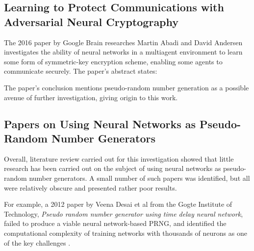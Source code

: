 \documentclass[12pt, titlepage]{report}
\theoremstyle{definition}
\begin{document}
\subsection{Learning to Protect Communications with Adversarial Neural Cryptography}
The 2016 paper by Google Brain researches Martin Abadi and David Andersen investigates the ability of neural networks in a multiagent environment to learn some form of symmetric-key encryption scheme, enabling some agents to communicate securely. The paper's abstract states:

 \cite{abadi2016learning}

The paper's conclusion mentions pseudo-random number generation as a possible avenue of further investigation, giving origin to this work. 



\subsection{Papers on Using Neural Networks as Pseudo-Random Number Generators}
Overall, literature review carried out for this investigation showed that little research has been carried out on the subject of using neural networks as pseudo-random number generators. A small number of such papers was identified, but all were relatively obscure and presented rather poor results.

For example, a 2012 paper by Veena Desai et al from the Gogte Institute of Technology, \textit{Pseudo random number generator using time delay neural network}, failed to produce a viable neural network-based PRNG, and identified the computational complexity of training networks with thousands of neurons as one of the key challenges \cite{desai2012pseudo}.
\end{document}
